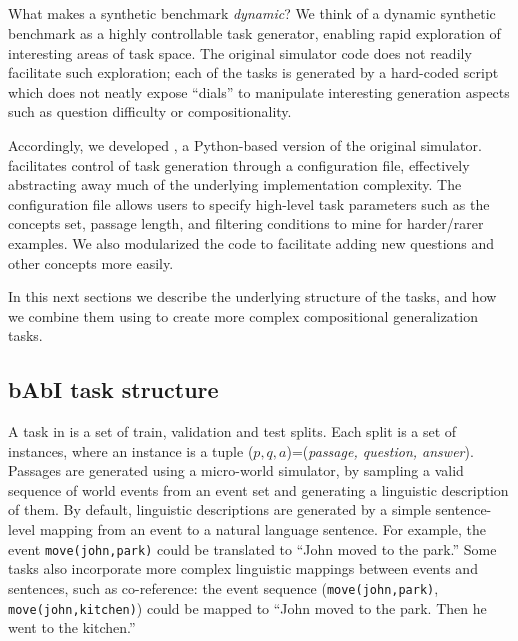 
\subsection{\pybabi}
\label{ssec:pybabi}
What makes a synthetic benchmark \emph{dynamic}? We think of a dynamic synthetic benchmark as a highly controllable task generator, enabling rapid exploration of interesting areas of task space. The original \babibm simulator code does not readily facilitate such exploration; each of the \babibm tasks is generated by a hard-coded script which does not neatly expose ``dials'' to manipulate interesting generation aspects such as question difficulty or compositionality. 

Accordingly, we developed \pybabi, a Python-based version of the original simulator. \pybabi facilitates control of task generation through a configuration file, effectively abstracting away much of the underlying implementation complexity. The configuration file allows users to specify high-level task parameters such as the concepts set, passage length, and filtering conditions to mine for harder/rarer examples. We also modularized the code to facilitate adding new questions and other concepts more easily.

In this next sections we describe the underlying structure of the \babibm tasks, and how we combine them using \pybabi to create more complex compositional generalization tasks.

\subsection{bAbI task structure}
\label{ssec:task_structure}
A task in \babibm is a set of train, validation and test splits. Each split is a set of instances, where an instance is a tuple ($p,q,a$)=(\textit{passage, question, answer}). Passages are generated using a micro-world simulator, by sampling a valid sequence of world events from an event set \eventset and generating a linguistic description of them. By default, linguistic descriptions are generated by a simple sentence-level mapping from an event to a natural language sentence. For example, the event \texttt{move(john,park)} could be translated to ``John moved to the park.'' Some tasks also incorporate more complex linguistic mappings between events and sentences, such as co-reference: the event sequence (\texttt{move(john,park)}, \texttt{move(john,kitchen)}) could be mapped to ``John moved to the park. Then he went to the kitchen.'' 

